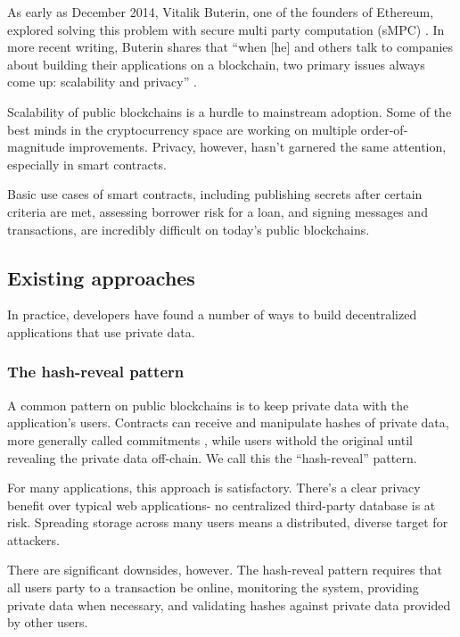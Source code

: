 \documentclass[11pt]{article}
\begin{document}
As early as December 2014, Vitalik Buterin, one of the founders of
Ethereum, explored solving this problem with secure multi party
computation (sMPC) \cite{secretSharingDaos}. In more recent writing,
Buterin shares that ``when [he] and others talk to companies about
building their applications on a blockchain, two primary issues always
come up: scalability and privacy'' \cite{privacyOnTheBlockchain}.

Scalability of public blockchains is a hurdle to mainstream adoption.
Some of the best minds in the cryptocurrency space \cite{lightning}
\cite{ethereumSharding} \cite{plasma} are working on multiple
order-of-magnitude improvements. Privacy, however, hasn't garnered the
same attention, especially in smart contracts.

Basic use cases of smart contracts, including publishing secrets after
certain criteria are met, assessing borrower risk for a loan, and
signing messages and transactions, are incredibly difficult on today's
public blockchains.

\subsection{Existing approaches}

In practice, developers have found a number of ways to build
decentralized applications that use private data.

\subsubsection{The hash-reveal pattern}

A common pattern on public blockchains is to keep private data with
the application's users. Contracts can receive and manipulate hashes
of private data, more generally called commitments
\cite{commitmentScheme}, while users withold the original until
revealing the private data off-chain. We call this the ``hash-reveal''
pattern.

For many applications, this approach is satisfactory. There's a clear
privacy benefit over typical web applications- no centralized
third-party database is at risk. Spreading storage across many users
means a distributed, diverse target for attackers.

There are significant downsides, however. The hash-reveal pattern
requires that all users party to a transaction be online, monitoring
the system, providing private data when necessary, and validating
hashes against private data provided by other users.
\end{document}
